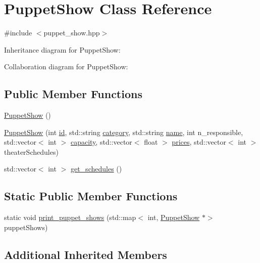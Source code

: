 \hypertarget{class_puppet_show}{}\section{Puppet\+Show Class Reference}
\label{class_puppet_show}


{\ttfamily \#include $<$puppet\+\_\+show.\+hpp$>$}



Inheritance diagram for Puppet\+Show\+:


Collaboration diagram for Puppet\+Show\+:
\subsection*{Public Member Functions}
\begin{DoxyCompactItemize}
\item 
\hyperlink{class_puppet_show_a7289fbaf279023c6198880b580c2d69d}{Puppet\+Show} ()
\item 
\hyperlink{class_puppet_show_a5e2a9ecaba3174d380a0c02a020672a9}{Puppet\+Show} (int \hyperlink{class_event_a08ba599a781bea8b678251fdb7290890}{id}, std\+::string \hyperlink{class_event_a5634221828f8d3f823598b1fa22e3392}{category}, std\+::string \hyperlink{class_event_ae116bf76fb01a92e000579a5a0d6f35c}{name}, int n\+\_\+responsible, std\+::vector$<$ int $>$ \hyperlink{class_event_a75eb887870ee5c4a4bf502d98a7cd6a3}{capacity}, std\+::vector$<$ float $>$ \hyperlink{class_event_a49d863913759f2294cc4c8bdbc2be9fe}{prices}, std\+::vector$<$ int $>$ theater\+Schedules)
\item 
std\+::vector$<$ int $>$ \hyperlink{class_puppet_show_a446ad8e871ff4182604d2f19450a5ca0}{get\+\_\+schedules} ()
\end{DoxyCompactItemize}
\subsection*{Static Public Member Functions}
\begin{DoxyCompactItemize}
\item 
static void \hyperlink{class_puppet_show_aea8a4892d7e08b311a49504e22c84c4e}{print\+\_\+puppet\+\_\+shows} (std\+::map$<$ int, \hyperlink{class_puppet_show}{Puppet\+Show} $\ast$$>$ puppet\+Shows)
\end{DoxyCompactItemize}
\subsection*{Additional Inherited Members}


